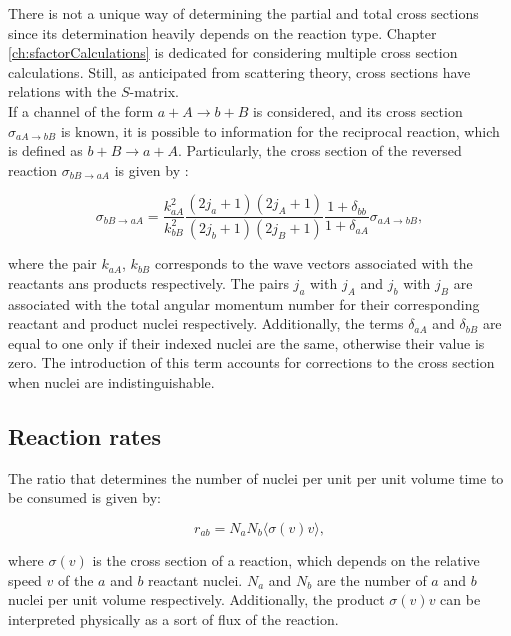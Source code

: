 \documentclass[openany]{book}
\begin{document}
There is not a unique way of determining the partial and total cross sections since its determination heavily depends  on the reaction type. Chapter \ref{ch:sfactorCalculations} is dedicated for considering multiple cross section calculations. Still, as anticipated from scattering theory, cross sections have relations with the $S$-matrix. \\

If a channel of the form $a + A \rightarrow b + B$ is considered, and its cross section $\sigma_{aA \rightarrow bB}$ is known, it is possible to information for the reciprocal reaction, which is defined as  $ b + B \rightarrow a + A$. Particularly, the cross section of the reversed reaction $\sigma_{bB \rightarrow aA}$  is given by  \cite{iliadis_2015}:

\begin{equation}\label{eq:nuclearReaction_reciprocal}
	  \sigma_{bB \rightarrow aA} = \frac{k^2_{aA}}{k^2_{bB}} \frac{(2j_a + 1)(2j_A + 1) }{ (2j_b + 1)(2j_B + 1) } \frac{1 + \delta_{bb}}{1 + \delta_{aA}} \sigma_{aA \rightarrow bB} ,  
\end{equation}

where the pair $k_{aA}$, $k_{bB}$ corresponds to the wave vectors associated with the reactants ans products respectively. The pairs $j_a$ with $j_A$ and $j_b$ with $j_B$ are associated with the total angular momentum number for their corresponding reactant and product nuclei respectively. Additionally, the terms $\delta_{aA}$ and  $\delta_{bB}$ are equal to one only if their indexed nuclei are the same, otherwise their value is zero. The introduction of this term accounts for corrections to the cross section when nuclei are indistinguishable. 

\subsection{Reaction rates} \label{sub:reactionRates}

The ratio that determines the number of nuclei per unit per unit volume time to be consumed is given by: 

\begin{equation}  \label{eq:reactionRate_generic}
	r_{ab} = N_aN_b \langle \sigma (v)  v \rangle,
\end{equation}

where $\sigma(v)$ is the cross section of a reaction, which depends on the relative speed $v$ of the $a$ and $b$ reactant nuclei. $N_a$ and $N_b$ are the number of $a$ and $b$ nuclei per unit volume respectively. Additionally, the  product $\sigma (v) v$ can be interpreted physically as a sort of flux of the reaction. \\
\end{document}
